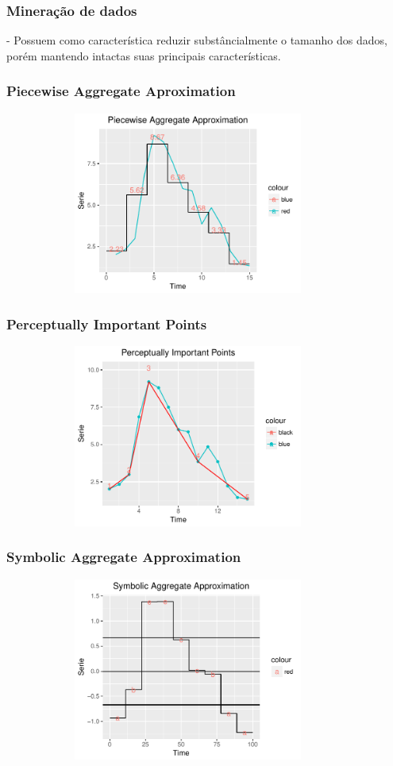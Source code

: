 \documentclass[10pt, compress]{beamer}
\begin{document}
\begin{frame}[fragile]
\frametitle{Mineração de dados}

- Possuem como característica reduzir substâncialmente o tamanho dos dados, porém mantendo intactas suas principais características.
\end{frame}

\begin{frame}[fragile]
\frametitle{Piecewise Aggregate Aproximation}
\begin{figure}
  \centering
   \includegraphics[width=10cm,height=6cm]{PAA.pdf}
\end{figure}
\end{frame}

\begin{frame}[fragile]
\frametitle{Perceptually Important Points}
\begin{figure}
  \centering
   \includegraphics[width=10cm,height=6cm]{PIP.pdf}
\end{figure}
\end{frame}

\begin{frame}[fragile]
\frametitle{Symbolic Aggregate Approximation}
\begin{figure}
  \centering
   \includegraphics[width=10cm,height=6cm]{SAX.pdf}
\end{figure}
\end{frame}
\end{document}
